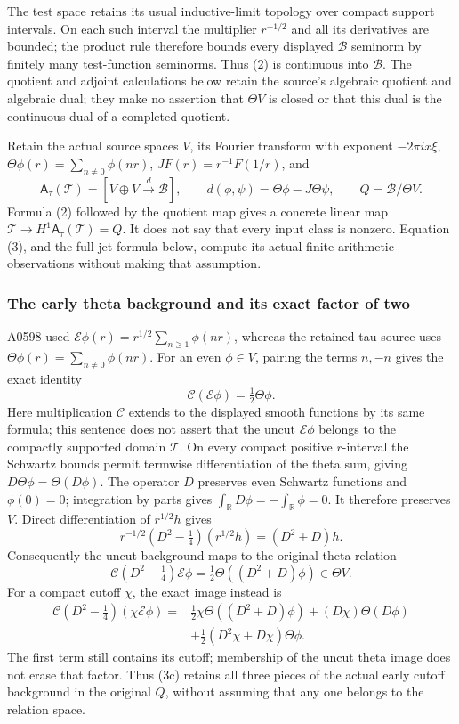 \documentclass[10pt,a4paper,oneside]{report}
\begin{document}
The test space retains its usual inductive-limit topology over compact
support intervals. On each such interval the multiplier \(r^{-1/2}\) and
all its derivatives are bounded; the product rule therefore bounds every
displayed \(\mathscr B\) seminorm by finitely many test-function
seminorms. Thus (2) is continuous into \(\mathscr B\). The quotient and
adjoint calculations below retain the source's algebraic quotient and
algebraic dual; they make no assertion that \(\Theta V\) is closed or
that this dual is the continuous dual of a completed quotient.

Retain the actual source spaces \(V\), its Fourier transform with
exponent \(-2\pi i x\xi\), \(\Theta\phi(r)=\sum_{n\ne0}\phi(nr)\),
\(JF(r)=r^{-1}F(1/r)\), and \[
\mathsf A_\tau(\mathcal T)=[V\oplus V\xrightarrow{d}\mathscr B],\qquad
d(\phi,\psi)=\Theta\phi-J\Theta\psi,
\qquad Q=\mathscr B/\Theta V.
\] Formula (2) followed by the quotient map gives a concrete linear map
\(\mathscr T\to H^1\mathsf A_\tau(\mathcal T)=Q\). It does not say that
every input class is nonzero. Equation (3), and the full jet formula
below, compute its actual finite arithmetic observations without making
that assumption.

\subsubsection{The early theta background and its exact factor of
two}\label{proof09:the-early-theta-background-and-its-exact-factor-of-two}

A0598 used \(\mathcal E\phi(r)=r^{1/2}\sum_{n\ge1}\phi(nr)\), whereas
the retained tau source uses \(\Theta\phi(r)=\sum_{n\ne0}\phi(nr)\). For
an even \(\phi\in V\), pairing the terms \(n,-n\) gives the exact
identity \[
\mathcal C(\mathcal E\phi)=\tfrac12\Theta\phi.
\tag{3a}
\] Here multiplication \(\mathcal C\) extends to the displayed smooth
functions by its same formula; this sentence does not assert that the
uncut \(\mathcal E\phi\) belongs to the compactly supported domain
\(\mathscr T\). On every compact positive \(r\)-interval the Schwartz
bounds permit termwise differentiation of the theta sum, giving
\(D\Theta\phi=\Theta(D\phi)\). The operator \(D\) preserves even
Schwartz functions and \(\phi(0)=0\); integration by parts gives
\(\int_{\mathbb R} D\phi=-\int_{\mathbb R}\phi=0\). It therefore preserves
\(V\). Direct differentiation of \(r^{1/2}h\) gives \[
r^{-1/2}(D^2-\tfrac14)(r^{1/2}h)=(D^2+D)h.
\] Consequently the uncut background maps to the original theta relation
\[
\mathcal C(D^2-\tfrac14)\mathcal E\phi=\tfrac12\Theta((D^2+D)\phi)\in\Theta V.
\tag{3b}
\] For a compact cutoff \(\chi\), the exact image instead is \[
\begin{aligned}
\mathcal C(D^2-\tfrac14)(\chi\mathcal E\phi)
={}&\tfrac12\chi\Theta((D^2+D)\phi)
+(D\chi)\Theta(D\phi)\\
&+\tfrac12(D^2\chi+D\chi)\Theta\phi.
\end{aligned}
\tag{3c}
\] The first term still contains its cutoff; membership of the uncut
theta image does not erase that factor. Thus (3c) retains all three
pieces of the actual early cutoff background in the original \(Q\),
without assuming that any one belongs to the relation space.
\end{document}
